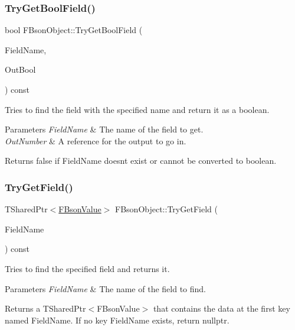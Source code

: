 \subsubsection{\texorpdfstring{Try\+Get\+Bool\+Field()}{TryGetBoolField()}}
{\footnotesize\ttfamily bool F\+Bson\+Object\+::\+Try\+Get\+Bool\+Field (\begin{DoxyParamCaption}\item[{const F\+String \&}]{Field\+Name,  }\item[{bool \&}]{Out\+Bool }\end{DoxyParamCaption}) const}

Tries to find the field with the specified name and return it as a boolean.


\begin{DoxyParams}{Parameters}
{\em Field\+Name} & The name of the field to get. \\
\hline
{\em Out\+Number} & A reference for the output to go in. \\
\hline
\end{DoxyParams}
\begin{DoxyReturn}{Returns}
false if Field\+Name doesn\textquotesingle{}t exist or cannot be converted to boolean. 
\end{DoxyReturn}
\mbox{\label{class_f_bson_object_ab6df900d2da6d850cac67bfb48862b22}} 
\subsubsection{\texorpdfstring{Try\+Get\+Field()}{TryGetField()}}
{\footnotesize\ttfamily T\+Shared\+Ptr$<$\mbox{\hyperlink{class_f_bson_value}{F\+Bson\+Value}}$>$ F\+Bson\+Object\+::\+Try\+Get\+Field (\begin{DoxyParamCaption}\item[{const F\+String \&}]{Field\+Name }\end{DoxyParamCaption}) const}

Tries to find the specified field and returns it.


\begin{DoxyParams}{Parameters}
{\em Field\+Name} & The name of the field to find. \\
\hline
\end{DoxyParams}
\begin{DoxyReturn}{Returns}
a T\+Shared\+Ptr$<$\+F\+Bson\+Value$>$ that contains the data at the first key named \textquotesingle{}Field\+Name\textquotesingle{}. If no key \textquotesingle{}Field\+Name\textquotesingle{} exists, return nullptr. 
\end{DoxyReturn}
\mbox{\label{class_f_bson_object_a1b1e5ef9cc72a00a8e3d246f7bed7842}} 
